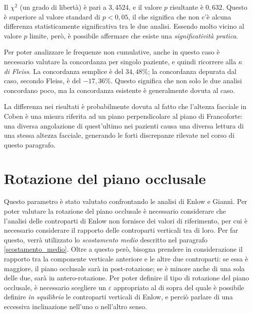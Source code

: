 Il $\chi^2$ (un grado di libertà) è pari a $3,4524$, e il valore $p$ risultante è $0,632$. Questo è superiore al valore standard di $p < 0,05$, il che significa che non c'è alcuna differenza statisticamente significativa tra le due analisi. Essendo molto vicino al valore $p$ limite, però, è possibile affermare che esiste una \emph{significatività pratica}.

Per poter analizzare le frequenze non cumulative, anche in questo caso è necessario valutare la concordanza per singolo paziente, e quindi ricorrere alla \emph{$\kappa$ di Fleiss}. La concordanza semplice è del $34,48\%$; la concordanza depurata dal caso, secondo Fleiss, è del $-17,36\%$. Questo significa che non solo le due analisi concordano poco, ma la concordanza esistente è generalmente dovuta al caso.

La differenza nei risultati è probabilmente dovuta al fatto che l'altezza facciale in Coben è una misura riferita ad un piano perpendicolare al piano di Francoforte: una diversa angolazione di quest'ultimo nei pazienti causa una diversa lettura di una stessa altezza facciale, generando le forti discrepanze rilevate nel corso di questo paragrafo.


\section{Rotazione del piano occlusale}
Questo parametro è stato valutato confrontando le analisi di Enlow e Giannì. Per poter valutare la rotazione del piano occlusale è necessario considerare che l'analisi delle controparti di Enlow non fornisce dei valori di riferimento, per cui è necessario considerare il rapporto delle controparti verticali tra di loro. Per far questo, verrà utilizzato lo \emph{scostamento medio} descritto nel paragrafo \vref{scostamento_medio}. Oltre a questo però, bisogna prendere in considerazione il rapporto tra la componente verticale anteriore e le altre due controparti: se essa è maggiore, il piano occlusale sarà in post-rotazione; se è minore anche di una sola delle due, sarà in antero-rotazione. Per poter definire il tipo di rotazione del piano occlusale, è necessario scegliere un $\varepsilon$ appropriato al di sopra del quale è possibile definire \emph{in squilibrio} le controparti verticali di Enlow, e perciò parlare di una eccessiva inclinazione nell'uno o nell'altro senso.

